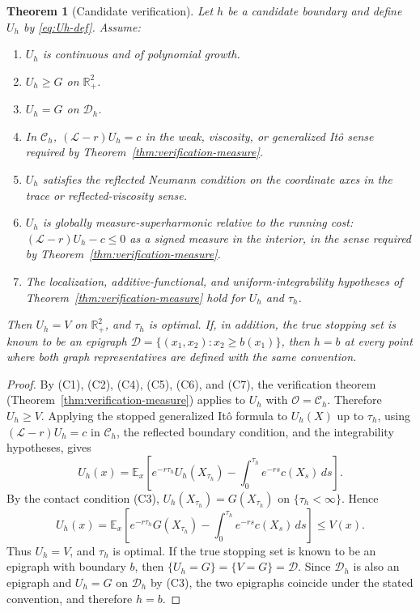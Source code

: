\documentclass[pdflatex,sn-mathphys-num]{sn-jnl}
\theoremstyle{plain}
\newtheorem{theorem}{Theorem}[section]
\theoremstyle{definition}
\newcommand{\R}{\mathbb{R}}
\begin{document}
\begin{theorem}[Candidate verification]
\label{thm:candidate-verification}
Let $h$ be a candidate boundary and define $U_h$ by \eqref{eq:Uh-def}. Assume:
\begin{enumerate}
\item[\textup{(C1)}] $U_h$ is continuous and of polynomial growth.
\item[\textup{(C2)}] $U_h\ge G$ on $\R^2_+$.
\item[\textup{(C3)}] $U_h=G$ on $\mathcal D_h$.
\item[\textup{(C4)}] In $\mathcal C_h$, $(\mathcal L-r)U_h=c$ in the weak,
viscosity, or generalized It\^o sense required by
Theorem~\ref{thm:verification-measure}.
\item[\textup{(C5)}] $U_h$ satisfies the reflected Neumann condition on the
coordinate axes in the trace or reflected-viscosity sense.
\item[\textup{(C6)}] $U_h$ is globally measure-superharmonic relative to the
running cost: $(\mathcal L-r)U_h-c\le0$ as a signed measure in the interior, in
the sense required by Theorem~\ref{thm:verification-measure}.
\item[\textup{(C7)}] The localization, additive-functional, and
uniform-integrability hypotheses of Theorem~\ref{thm:verification-measure} hold
for $U_h$ and $\tau_h$.
\end{enumerate}
Then $U_h=V$ on $\R^2_+$, and $\tau_h$ is optimal. If, in addition, the true
stopping set is known to be an epigraph
$\mathcal D=\{(x_1,x_2):x_2\ge b(x_1)\}$, then $h=b$ at every point where both
graph representatives are defined with the same convention.
\end{theorem}
\begin{proof}
By \textup{(C1)}, \textup{(C2)}, \textup{(C4)}, \textup{(C5)}, \textup{(C6)},
and \textup{(C7)}, the verification theorem
(Theorem~\ref{thm:verification-measure}) applies to $U_h$ with
$\mathcal O=\mathcal C_h$. Therefore $U_h\ge V$. Applying the stopped
generalized It\^o formula to $U_h(X)$ up to $\tau_h$, using
$(\mathcal L-r)U_h=c$ in $\mathcal C_h$, the reflected boundary condition, and
the integrability hypotheses, gives
\[
   U_h(x)
   =
   \mathbb E_x\left[
      e^{-r\tau_h}U_h(X_{\tau_h})
      -\int_0^{\tau_h}e^{-rs}c(X_s)\,ds
   \right].
\]
By the contact condition \textup{(C3)}, $U_h(X_{\tau_h})=G(X_{\tau_h})$ on
$\{\tau_h<\infty\}$. Hence
\[
   U_h(x)
   =
   \mathbb E_x\left[
      e^{-r\tau_h}G(X_{\tau_h})
      -\int_0^{\tau_h}e^{-rs}c(X_s)\,ds
   \right]
   \le V(x).
\]
Thus $U_h=V$, and $\tau_h$ is optimal. If the true stopping set is known to be
an epigraph with boundary $b$, then $\{U_h=G\}=\{V=G\}=\mathcal D$. Since
$\mathcal D_h$ is also an epigraph and $U_h=G$ on $\mathcal D_h$ by
\textup{(C3)}, the two epigraphs coincide under the stated convention, and
therefore $h=b$.
\end{proof}
\end{document}
